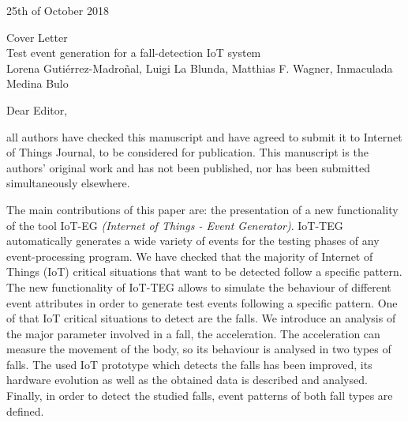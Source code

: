 \documentclass[parskip]{scrartcl}
\begin{document}
 
\pagestyle{empty}

\begin{flushright}
    \Large
    25th of October 2018
\end{flushright}

\begin{center}
    \huge
    Cover Letter\\
    \vspace{0.4cm}
    \LARGE
    Test event generation for a fall-detection IoT system\\
    \vspace{0.4cm}
    \large
    Lorena Gutiérrez-Madroñal, Luigi La Blunda, Matthias F. Wagner, Inmaculada Medina Bulo
\end{center}
 
    \vspace{0.8cm}

    \normalsize
Dear Editor,

all authors have checked this manuscript and have agreed to submit it to Internet of Things Journal, to be considered for publication.
This manuscript is the authors' original work and has not been published, nor has been submitted simultaneously elsewhere.

The main contributions of this paper are:
the presentation of a new functionality of the tool IoT-EG \textit{(Internet of Things - Event Generator)}. IoT-TEG automatically 
generates a wide variety of events for the testing phases of any event-processing program. We have checked that the majority of 
Internet of Things (IoT) critical situations that want to be detected follow a specific pattern. The new functionality of IoT-TEG 
allows to simulate the behaviour of different event attributes in order to generate test events following a specific pattern. 
One of that IoT critical situations to detect are the falls. We introduce an analysis of the major parameter involved in a fall, 
the acceleration. The acceleration can measure the movement of the body, so its behaviour is analysed in two types of falls. 
The used IoT prototype which detects the falls has been improved, its hardware evolution as well as the obtained data is described 
and analysed. Finally, in order to detect the studied falls, event patterns of both fall types are defined.
\end{document}
